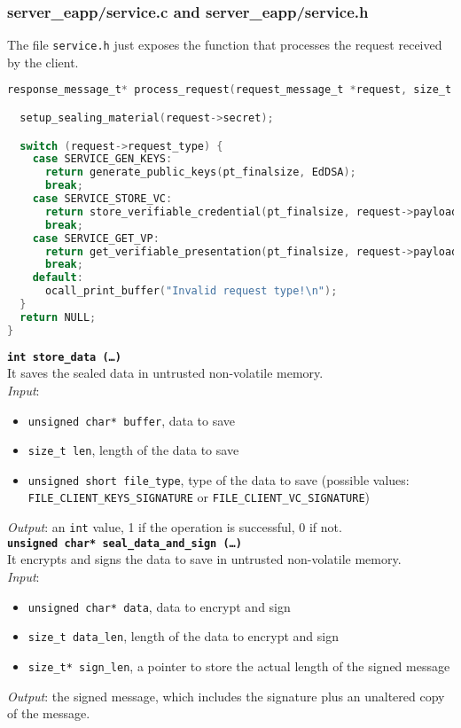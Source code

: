 
\subsubsection{server\_eapp/service.c and server\_eapp/service.h}
\label{service.c}
The file \texttt{service.h} just exposes the function that processes the request received by the client. \\   
\begin{lstlisting}[language=C,frame=single]
response_message_t* process_request(request_message_t *request, size_t *pt_finalsize) {

  setup_sealing_material(request->secret);

  switch (request->request_type) {
    case SERVICE_GEN_KEYS:
      return generate_public_keys(pt_finalsize, EdDSA);
      break;
    case SERVICE_STORE_VC:
      return store_verifiable_credential(pt_finalsize, request->payload, request->len);
      break;
    case SERVICE_GET_VP:
      return get_verifiable_presentation(pt_finalsize, request->payload, request->len, EdDSA);
      break;
    default:  
      ocall_print_buffer("Invalid request type!\n");
  }
  return NULL;
}
\end{lstlisting}

\noindent
\texttt{\bfseries int store\_data (\dots)}\\
It saves the sealed data in untrusted non-volatile memory. \\
\textit{Input}:
\begin{itemize}[noitemsep,nolistsep]
  \item \texttt{unsigned char* buffer}, data to save
  \item \texttt{size\_t len}, length of the data to save
  \item \texttt{unsigned short file\_type}, type of the data to save (possible values: \texttt{FILE\_CLI\-ENT\_KEYS\_SIGNATURE} or \texttt{FILE\_CLIENT\_VC\_SIGNATURE})
\end{itemize}
\textit{Output}: an \texttt{int} value, 1 if the operation is successful, 0 if not. \\

\noindent
\texttt{\bfseries unsigned char* seal\_data\_and\_sign (\dots)}\\
It encrypts and signs the data to save in untrusted non-volatile memory. \\
\textit{Input}:
\begin{itemize}[noitemsep,nolistsep]
  \item \texttt{unsigned char* data}, data to encrypt and sign
  \item \texttt{size\_t data\_len}, length of the data to encrypt and sign
  \item \texttt{size\_t* sign\_len}, a pointer to store the actual length of the signed message
\end{itemize}
\textit{Output}: the signed message, which includes the signature plus an unaltered copy of the message. \\


